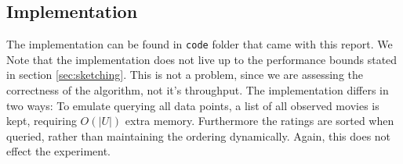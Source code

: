 \pgfplotsset{scaled x ticks=false}
\begin{center}
\end{center}

\subsection{Implementation}
The implementation can be found in \texttt{code} folder that came with this
report. We Note that the implementation does not live up to the performance
bounds stated in section \ref{sec:sketching}. This is not a problem, since we
are assessing the correctness of the algorithm, not it's throughput. The
implementation differs in two ways: To emulate querying all data points, a list
of all observed movies is kept, requiring $O(|U|)$ extra memory. Furthermore the
ratings are sorted when queried, rather than maintaining the ordering
dynamically. Again, this does not effect the experiment.
